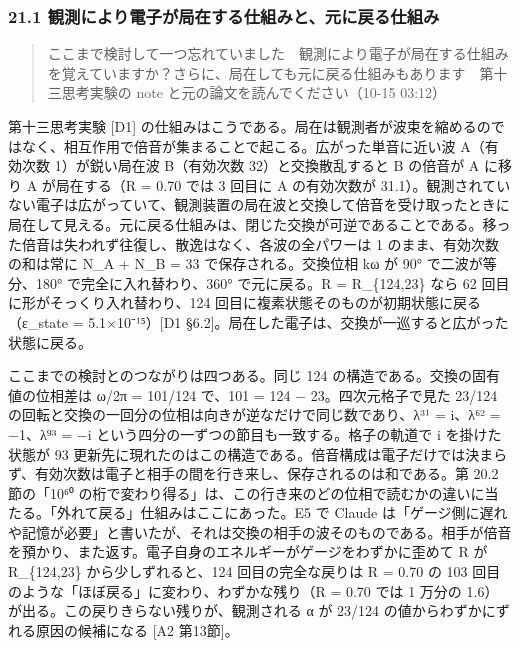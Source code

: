 \documentclass[
  a4paper,
]{ltjsarticle}
\begin{document}
\subsubsection{21.1
観測により電子が局在する仕組みと、元に戻る仕組み}\label{ux89b3ux6e2cux306bux3088ux308aux96fbux5b50ux304cux5c40ux5728ux3059ux308bux4ed5ux7d44ux307fux3068ux5143ux306bux623bux308bux4ed5ux7d44ux307f}

\begin{quote}
ここまで検討して一つ忘れていました　観測により電子が局在する仕組みを覚えていますか？さらに、局在しても元に戻る仕組みもあります　第十三思考実験の
note と元の論文を読んでください（10-15 03:12）
\end{quote}

第十三思考実験 {[}D1{]}
の仕組みはこうである。局在は観測者が波束を縮めるのではなく、相互作用で倍音が集まることで起こる。広がった単音に近い波
A（有効次数 1）が鋭い局在波 B（有効次数 32）と交換散乱すると B の倍音が
A に移り A が局在する（R = 0.70 では 3 回目に A の有効次数が
31.1）。観測されていない電子は広がっていて、観測装置の局在波と交換して倍音を受け取ったときに局在して見える。元に戻る仕組みは、閉じた交換が可逆であることである。移った倍音は失われず往復し、散逸はなく、各波の全パワーは
1 のまま、有効次数の和は常に N\_A + N\_B = 33 で保存される。交換位相 kω
が 90° で二波が等分、180° で完全に入れ替わり、360° で元に戻る。R =
R\_\{124,23\} なら 62 回目に形がそっくり入れ替わり、124
回目に複素状態そのものが初期状態に戻る（ε\_state = 5.1×10⁻¹⁵）{[}D1
§6.2{]}。局在した電子は、交換が一巡すると広がった状態に戻る。

ここまでの検討とのつながりは四つある。同じ 124
の構造である。交換の固有値の位相差は ω/2π = 101/124 で、101 = 124 −
23。四次元格子で見た 23/124
の回転と交換の一回分の位相は向きが逆なだけで同じ数であり、λ³¹ = i、λ⁶² =
−1、λ⁹³ = −i という四分の一ずつの節目も一致する。格子の軌道で i
を掛けた状態が 93
更新先に現れたのはこの構造である。倍音構成は電子だけでは決まらず、有効次数は電子と相手の間を行き来し、保存されるのは和である。第
20.2 節の「10⁶⁰
の桁で変わり得る」は、この行き来のどの位相で読むかの違いに当たる。「外れて戻る」仕組みはここにあった。E5
で Claude
は「ゲージ側に遅れや記憶が必要」と書いたが、それは交換の相手の波そのものである。相手が倍音を預かり、また返す。電子自身のエネルギーがゲージをわずかに歪めて
R が R\_\{124,23\} から少しずれると、124 回目の完全な戻りは R = 0.70 の
103 回目のような「ほぼ戻る」に変わり、わずかな残り（R = 0.70 では 1
万分の 1.6）が出る。この戻りきらない残りが、観測される α が 23/124
の値からわずかにずれる原因の候補になる {[}A2 第13節{]}。
\end{document}
